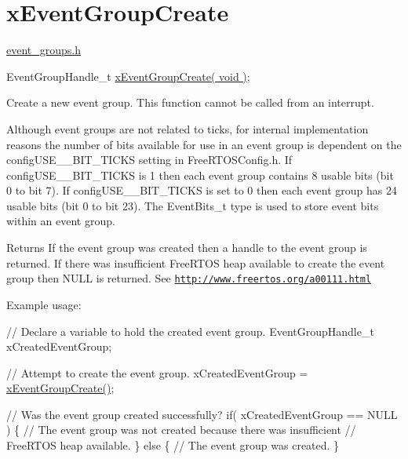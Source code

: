 \hypertarget{group__x_event_group_create}{}\section{x\+Event\+Group\+Create}
\label{group__x_event_group_create}
\hyperlink{event__groups_8h}{event\+\_\+groups.\+h} 
\begin{DoxyPre}
EventGroupHandle\_t \hyperlink{event__groups_8h_a7ed741a0902718aca9c8d3ca273f1b73}{xEventGroupCreate( void )};
\end{DoxyPre}


Create a new event group. This function cannot be called from an interrupt.

Although event groups are not related to ticks, for internal implementation reasons the number of bits available for use in an event group is dependent on the config\+U\+S\+E\+\_\+\_\+\+B\+I\+T\+\_\+\+T\+I\+C\+KS setting in Free\+R\+T\+O\+S\+Config.\+h. If config\+U\+S\+E\+\_\+\_\+\+B\+I\+T\+\_\+\+T\+I\+C\+KS is 1 then each event group contains 8 usable bits (bit 0 to bit 7). If config\+U\+S\+E\+\_\+\_\+\+B\+I\+T\+\_\+\+T\+I\+C\+KS is set to 0 then each event group has 24 usable bits (bit 0 to bit 23). The Event\+Bits\+\_\+t type is used to store event bits within an event group.

\begin{DoxyReturn}{Returns}
If the event group was created then a handle to the event group is returned. If there was insufficient Free\+R\+T\+OS heap available to create the event group then N\+U\+LL is returned. See \href{http://www.freertos.org/a00111.html}{\tt http\+://www.\+freertos.\+org/a00111.\+html}
\end{DoxyReturn}
Example usage\+: 
\begin{DoxyPre}
   // Declare a variable to hold the created event group.
   EventGroupHandle\_t xCreatedEventGroup;\end{DoxyPre}



\begin{DoxyPre}   // Attempt to create the event group.
   xCreatedEventGroup = \hyperlink{event__groups_8h_a7ed741a0902718aca9c8d3ca273f1b73}{xEventGroupCreate()};\end{DoxyPre}



\begin{DoxyPre}   // Was the event group created successfully?
   if( xCreatedEventGroup == NULL )
   \{
    // The event group was not created because there was insufficient
    // FreeRTOS heap available.
   \}
   else
   \{
    // The event group was created.
   \}
  \end{DoxyPre}
 